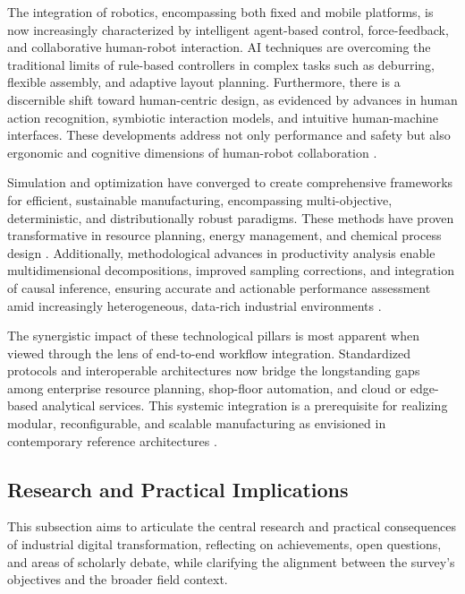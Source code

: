 \documentclass[sigconf]{acmart}
\begin{document}
The integration of robotics, encompassing both fixed and mobile platforms, is now increasingly characterized by intelligent agent-based control, force-feedback, and collaborative human-robot interaction. AI techniques are overcoming the traditional limits of rule-based controllers in complex tasks such as deburring, flexible assembly, and adaptive layout planning. Furthermore, there is a discernible shift toward human-centric design, as evidenced by advances in human action recognition, symbiotic interaction models, and intuitive human-machine interfaces. These developments address not only performance and safety but also ergonomic and cognitive dimensions of human-robot collaboration \cite{ref20}\cite{ref44}\cite{ref45}\cite{ref53}\cite{ref83}.

Simulation and optimization have converged to create comprehensive frameworks for efficient, sustainable manufacturing, encompassing multi-objective, deterministic, and distributionally robust paradigms. These methods have proven transformative in resource planning, energy management, and chemical process design \cite{ref80}\cite{ref84}\cite{ref85}. Additionally, methodological advances in productivity analysis enable multidimensional decompositions, improved sampling corrections, and integration of causal inference, ensuring accurate and actionable performance assessment amid increasingly heterogeneous, data-rich industrial environments \cite{ref87}.

The synergistic impact of these technological pillars is most apparent when viewed through the lens of end-to-end workflow integration. Standardized protocols and interoperable architectures now bridge the longstanding gaps among enterprise resource planning, shop-floor automation, and cloud or edge-based analytical services. This systemic integration is a prerequisite for realizing modular, reconfigurable, and scalable manufacturing as envisioned in contemporary reference architectures \cite{ref3}\cite{ref29}.

\subsection{Research and Practical Implications}

This subsection aims to articulate the central research and practical consequences of industrial digital transformation, reflecting on achievements, open questions, and areas of scholarly debate, while clarifying the alignment between the survey's objectives and the broader field context.
\end{document}
